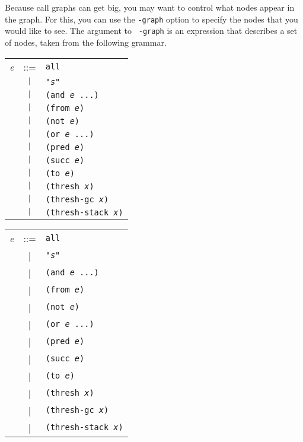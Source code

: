 Because call graphs can get big, you may want to control what nodes
appear in the graph.  For this, you can use the {\tt -graph} option to
specify the nodes that you would like to see.  The argument to {\tt
-graph} is an expression that describes a set of nodes, taken from the
following grammar.

\begin{latexonly}
\begin{center}
\begin{tabular}{lcl}
{\it e} & ::= & {\tt all} \\
& $\ |\ $ & {\tt "{\it s}"} \\
& $\ |\ $ & {\tt (and {\it e} ...)} \\
& $\ |\ $ & {\tt (from {\it e})} \\
& $\ |\ $ & {\tt (not {\it e})} \\
& $\ |\ $ & {\tt (or {\it e} ...)} \\
& $\ |\ $ & {\tt (pred {\it e})} \\
& $\ |\ $ & {\tt (succ {\it e})} \\
& $\ |\ $ & {\tt (to {\it e})} \\
& $\ |\ $ & {\tt (thresh {\it x})} \\
& $\ |\ $ & {\tt (thresh-gc {\it x})} \\
& $\ |\ $ & {\tt (thresh-stack {\it x})} \\
\end{tabular}
\end{center}
\end{latexonly}
\begin{htmlonly}
\begin{center}
\begin{tabular}{lcl}
{\it e} & ::= & {\tt all} \\
& | & {\tt "{\it s}"} \\
& | & {\tt (and {\it e} ...)} \\
& | & {\tt (from {\it e})} \\
& | & {\tt (not {\it e})} \\
& | & {\tt (or {\it e} ...)} \\
& | & {\tt (pred {\it e})} \\
& | & {\tt (succ {\it e})} \\
& | & {\tt (to {\it e})} \\
& | & {\tt (thresh {\it x})} \\
& | & {\tt (thresh-gc {\it x})} \\
& | & {\tt (thresh-stack {\it x})} \\
\end{tabular}
\end{center}
\end{htmlonly}

